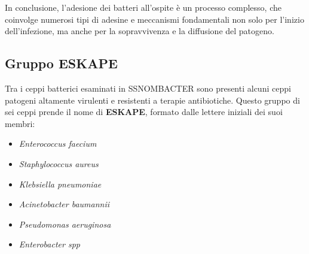 \documentclass[../main.tex]{subfiles}
\begin{document}
In conclusione, l'adesione dei batteri all'ospite è un processo complesso, che coinvolge numerosi tipi di adesine e meccanismi fondamentali non solo per l'inizio dell'infezione, ma anche per la sopravvivenza e la diffusione del patogeno.\bigskip

\subsection{Gruppo ESKAPE}

Tra i ceppi batterici esaminati in SSNOMBACTER sono presenti alcuni ceppi patogeni altamente virulenti e resistenti a terapie antibiotiche. Questo gruppo di sei ceppi prende il nome di \textbf{ESKAPE}, formato dalle lettere iniziali dei suoi membri:

\begin{itemize}
	\itemsep0em
	\item \textit{Enterococcus faecium}
	\item \textit{Staphylococcus aureus}
	\item \textit{Klebsiella pneumoniae}
	\item \textit{Acinetobacter baumannii}
	\item \textit{Pseudomonas aeruginosa}
	\item \textit{Enterobacter spp}
\end{itemize}
\end{document}
